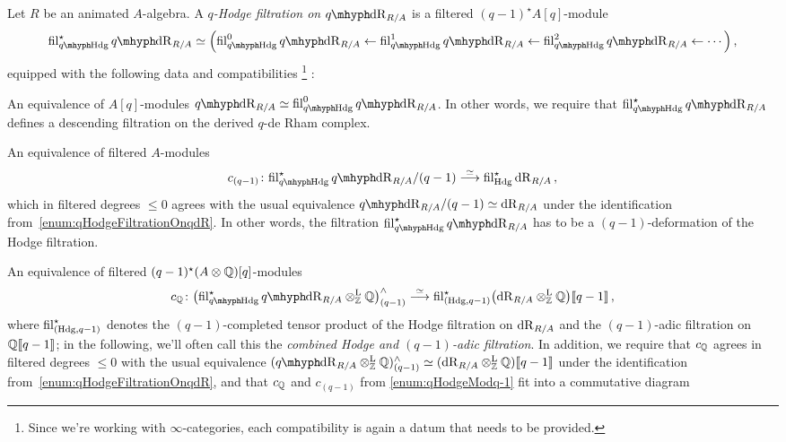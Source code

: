 \documentclass[DIV=12,numbers=enddot,leqno,bibliography=totoc]{scrartcl}
\begin{document}
	\begin{defi}\label{def:qHodgeFiltration}
		Let $R$ be an animated $A$-algebra. A \emph{$q$-Hodge filtration on $\qdeRham_{R/A}$} is a filtered $(q-1)^\star A[q]$-module
		\begin{equation*}
			\fil_{\qHodge}^\star \qdeRham_{R/A}\simeq \Bigl( \fil_{\qHodge}^0\qdeRham_{R/A}\leftarrow \fil_{\qHodge}^1\qdeRham_{R/A}\leftarrow\fil_{\qHodge}^2\qdeRham_{R/A}\leftarrow \dotsb\Bigr)\,,
		\end{equation*}
		equipped with the following data and compatibilities%
		\footnote{Since we're working with $\infty$-categories, each compatibility is again a datum that needs to be provided.}%
		:
		\begin{alphanumerate}
			\item\label{enum:qHodgeFiltrationOnqdR} An equivalence of $A[q]$-modules $\qdeRham_{R/A}\simeq  \fil_{\qHodge}^0\qdeRham_{R/A}$. In other words, we require that $\fil_{\qHodge}^\star \qdeRham_{R/A}$ defines a descending filtration on the derived $q$-de Rham complex.
			\item\label{enum:qHodgeModq-1} An equivalence of filtered $A$-modules
			\begin{equation*}
				c_{(q-1)}\colon  \fil_{\qHodge}^\star \qdeRham_{R/A}/(q-1)\overset{\simeq}{\longrightarrow} \fil_{\Hodge}^\star \deRham_{R/A}\,,
			\end{equation*}
			which in filtered degrees $\leqslant 0$ agrees with the usual equivalence $\qdeRham_{R/A}/(q-1)\simeq \deRham_{R/A}$ under the identification from~\cref{enum:qHodgeFiltrationOnqdR}. In other words, the filtration $ \fil_{\qHodge}^\star \qdeRham_{R/A}$ has to be a $(q-1)$-deformation of the Hodge filtration.
			\item\label{enum:qHodgeRational} An equivalence of filtered $(q-1)^\star (A\otimes\mathbb{Q})[q]$-modules
			\begin{equation*}
				c_\IQ\colon \bigl( \fil_{\qHodge}^\star \qdeRham_{R/A}\lotimes_\IZ\IQ\bigr)_{(q-1)}^\complete\overset{\simeq}{\longrightarrow}  \fil_{(\Hodge,q-1)}^\star \bigl(\deRham_{R/A}\lotimes_\IZ\IQ\bigr)\qpower\,,
			\end{equation*}
			where $\operatorname{fil}_{(\mathrm{Hdg},q-1)}^\star $ denotes the $(q-1)$-completed tensor product of the Hodge filtration on $\mathrm{dR}_{R/A}$ and the $(q-1)$-adic filtration on $\mathbb{Q}\llbracket q-1\rrbracket$; in the following, we'll often call this the \emph{combined Hodge and $(q-1)$-adic filtration}. In addition, we require that $c_{\mathbb{Q}}$ agrees in filtered degrees $\leqslant 0$ with the usual equivalence $(\qdeRham_{R/A}\lotimes_\IZ\IQ)_{(q-1)}^\complete\simeq (\deRham_{R/A}\lotimes_\IZ\IQ)\qpower$ under the identification from~\cref{enum:qHodgeFiltrationOnqdR}, and that $c_{\mathbb{Q}}$ and $c_{(q-1)}$ from \cref{enum:qHodgeModq-1} fit into a commutative diagram

\end{alphanumerate}
\end{defi}
\end{document}
